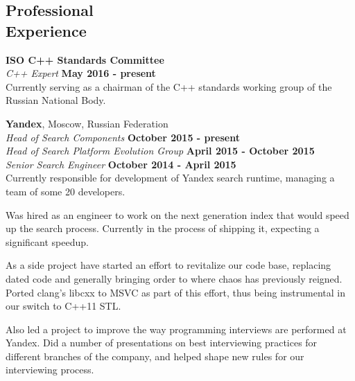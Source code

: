\documentclass[margin,line]{CV}
\begin{document}
\begin{resume}
    
    
    \section{\mysidestyle Professional\\Experience}
    \textbf{ISO C++ Standards Committee} \vspace{2mm}\\\vspace{1mm}%
    \textsl{C++ Expert} \hfill \textbf{May 2016 - present}\\\vspace{1mm}%
    Currently serving as a chairman of the C++ standards working group of the Russian National Body.
   
    
    \textbf{Yandex}, Moscow, Russian Federation \vspace{2mm}\\\vspace{1mm}%
    \textsl{Head of Search Components} \hfill \textbf{October 2015 - present}\\\vspace{1mm}%
    \textsl{Head of Search Platform Evolution Group} \hfill \textbf{April 2015 - October 2015}\\\vspace{1mm}%
    \textsl{Senior Search Engineer} \hfill \textbf{October 2014 - April 2015}\\
    Currently responsible for development of Yandex search runtime, managing a team of some 20 developers.
    
    Was hired as an engineer to work on the next generation index that would speed up the search process. Currently in the process of shipping it, expecting a significant speedup.

    As a side project have started an effort to revitalize our code base, replacing dated code and generally bringing order to where chaos has previously reigned. Ported clang's libcxx to MSVC as part of this effort, thus being instrumental in our switch to C++11 STL.

    Also led a project to improve the way programming interviews are performed at Yandex. Did a number of presentations on best interviewing practices for different branches of the company, and helped shape new rules for our interviewing process.


\end{resume}
\end{document}
